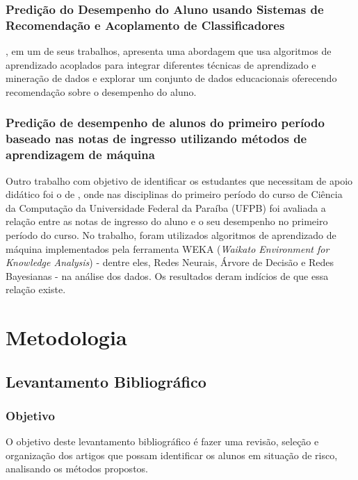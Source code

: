 \documentclass[
	12pt,				%
	openright,			%
	oneside,
	a4paper,			%
	english,			%
	french,				%
	spanish,			%
	brazil,				%
	]{abntex2}
\begin{document}
\subsection{Predição do Desempenho do Aluno usando Sistemas de Recomendação e Acoplamento de Classificadores}
\label{sec:Pred1}
, em um de seus trabalhos, apresenta uma abordagem que usa algoritmos de aprendizado acoplados para integrar diferentes técnicas de aprendizado e mineração de dados e explorar um conjunto de dados educacionais oferecendo recomendação sobre o desempenho do aluno.

\subsection{Predição de desempenho de alunos do primeiro período baseado nas notas de ingresso utilizando métodos de aprendizagem de máquina}
\label{sec:Pred2}
Outro trabalho com objetivo de identificar os estudantes que necessitam de apoio didático foi o de , onde nas disciplinas do primeiro período do curso de Ciência da Computação da Universidade Federal da Paraíba (UFPB) foi avaliada a relação entre as notas de ingresso do aluno e o seu desempenho no primeiro período do curso. No trabalho, foram utilizados algoritmos de aprendizado de máquina implementados pela ferramenta WEKA (\textit{Waikato Environment for Knowledge Analysis}) - dentre eles, Redes Neurais, Árvore de Decisão e Redes Bayesianas - na análise dos dados. Os resultados deram indícios de que essa relação existe.


\chapter{Metodologia}

\section{Levantamento Bibliográfico}
\label{sec:L}
\subsection{Objetivo}
\label{sec:Obj}
O objetivo deste levantamento bibliográfico é fazer uma revisão, seleção e organização dos artigos que possam identificar os alunos em situação de risco, analisando os métodos propostos.

\end{document}
